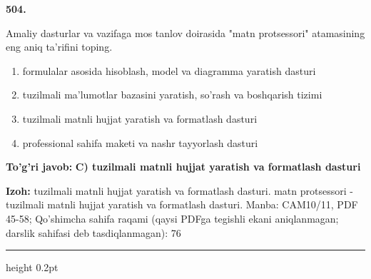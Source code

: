\documentclass[10pt,a4paper]{article}
\begin{document}
{\bfseries\sffamily\color{ink} 504.}
\par
Amaliy dasturlar va vazifaga mos tanlov doirasida "matn protsessori" atamasining eng aniq ta'rifini toping.
\begin{enumerate}[label=\Alph*),leftmargin=9mm]
\item formulalar asosida hisoblash, model va diagramma yaratish dasturi
\item tuzilmali ma'lumotlar bazasini yaratish, so'rash va boshqarish tizimi
\item tuzilmali matnli hujjat yaratish va formatlash dasturi
\item professional sahifa maketi va nashr tayyorlash dasturi
\end{enumerate}
\begin{tcolorbox}[enhanced,breakable,colback=teal!4,colframe=teal!60!black,boxrule=0.45pt,arc=1.2mm,left=2.7mm,right=2.7mm,top=1.8mm,bottom=1.8mm,before skip=2mm,after skip=2mm]
{\bfseries\sffamily\color{teal}To'g'ri javob:} \textbf{C) tuzilmali matnli hujjat yaratish va formatlash dasturi}
\par\smallskip
{\bfseries Izoh:} tuzilmali matnli hujjat yaratish va formatlash dasturi. matn protsessori - tuzilmali matnli hujjat yaratish va formatlash dasturi. Manba: CAM10/11, PDF 45-58; Qo'shimcha sahifa raqami (qaysi PDFga tegishli ekani aniqlanmagan; darslik sahifasi deb tasdiqlanmagan): 76
\end{tcolorbox}
\vspace{2mm}\hrule height 0.2pt\vspace{3mm}
\end{document}
